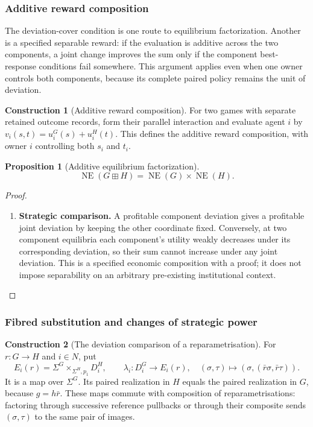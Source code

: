 \documentclass[11pt,a4paper]{article}
\numberwithin{equation}{section}
\newtheorem{proposition}[theorem]{Proposition}
\theoremstyle{definition}
\newtheorem{construction}[construction]{Construction}
\theoremstyle{remark}
\theoremstyle{plain}
\begin{document}
\subsubsection{Additive reward composition}

The deviation-cover condition is one route to equilibrium
factorization. Another is a specified separable reward: if the evaluation
is additive across the two components, a joint change improves the sum
only if the component best-response conditions fail somewhere. This
argument applies even when one owner controls both components, because
its complete paired policy remains the unit of deviation.

\begin{construction}[Additive reward composition]
\label{con:egt-additive-reward}
For two games with separate retained outcome records, form their
parallel interaction and evaluate agent $i$ by
$v_i(s,t)=u_i^G(s)+u_i^H(t)$. This defines the additive reward
composition, with owner $i$ controlling both $s_i$ and $t_i$.
\end{construction}

\begin{proposition}[Additive equilibrium factorization]
\label{prop:egt-additive-equilibrium}
\[
 \operatorname{NE}(G\boxplus H)
   =\operatorname{NE}(G)\times\operatorname{NE}(H).
\]
\end{proposition}
\begin{proof}
\leavevmode
\begin{enumerate}[label=\textup{(\arabic*)},leftmargin=*,itemsep=4pt,topsep=3pt]
  \item \textbf{Strategic comparison.} A profitable component deviation gives a profitable joint
deviation by keeping the other coordinate fixed. Conversely, at two
component equilibria each component's utility weakly decreases under
its corresponding deviation, so their sum cannot increase under any
joint deviation. This is a specified economic
composition with a proof; it does not impose separability on an
arbitrary pre-existing institutional context.
\end{enumerate}
\end{proof}

\subsubsection{Fibred substitution and changes of strategic power}

\begin{construction}[The deviation comparison of a reparametrisation]
\label{con:fib-deviation-comparison}
For $r:G\to H$ and $i\in N$, put
\[
 E_i(r)=\Sigma^G\times_{\Sigma^H,p_1}D_i^H,
 \qquad
 \lambda_i:D_i^G\to E_i(r),\quad
 (\sigma,\tau)\mapsto(\sigma,(\bar r\sigma,\bar r\tau)).
\]
It is a map over $\Sigma^G$. Its paired realization in $H$ equals
the paired realization in $G$, because $g=h\bar r$.
These maps commute with composition of reparametrisations: factoring
through successive reference pullbacks or through their composite sends
$(\sigma,\tau)$ to the same pair of images.
\end{construction}
\end{document}
